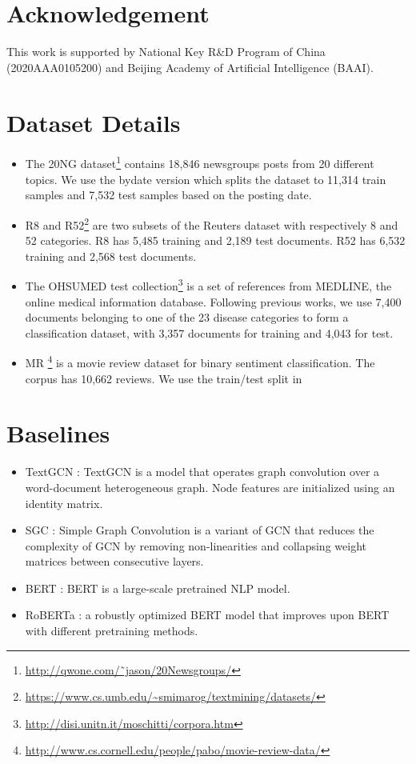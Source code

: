 \documentclass[11pt,a4paper]{article}
\begin{document}
\section*{Acknowledgement}
This work is supported by National Key R\&D Program of China (2020AAA0105200) and Beijing Academy of Artificial Intelligence (BAAI).




\appendix
\section{Dataset Details}
\begin{itemize}
    \item The 20NG dataset\footnote{\url{http://qwone.com/˜jason/20Newsgroups/}} contains 18,846 newsgroups posts from 20 different topics. We use the bydate version which splits the dataset to 11,314 train samples and 7,532 test samples based on the posting date.
    \item R8 and R52\footnote{\url{https://www.cs.umb.edu/~smimarog/textmining/datasets/}} are two subsets of the Reuters dataset with respectively 8 and 52 categories. R8 has 5,485 training and 2,189 test documents. R52 has 6,532 training and 2,568 test documents.
    \item The OHSUMED test collection\footnote{\url{http://disi.unitn.it/moschitti/corpora.htm}} is a set of references from MEDLINE, the online medical information database. Following previous works,  we use 7,400 documents belonging to one of the 23 disease categories to form a classification dataset, with 3,357 documents for training and 4,043 for test.
    \item MR \citep{pang-lee-2005-seeing}\footnote{\url{http://www.cs.cornell.edu/people/pabo/movie-review-data/}} is a movie review dataset for binary sentiment classification. The corpus has 10,662 reviews. We use the train/test split in \citet{tang2015pte}
\end{itemize}

\section{Baselines}
\begin{itemize}[noitemsep]
  \item TextGCN \citep{yao2019graph}: TextGCN is a model that operates graph convolution over a word-document heterogeneous graph. Node features are initialized using an identity matrix.
  \item SGC \citep{wu2019simplifying}: Simple Graph Convolution is a variant of GCN that reduces the complexity of GCN by removing non-linearities and collapsing weight matrices between consecutive layers.
  \item BERT \citep{devlin2018bert}: BERT is a large-scale pretrained NLP model.
  \item RoBERTa \citep{yinhan2019roberta}: a robustly optimized BERT model that improves upon BERT with different pretraining methods.
\end{itemize}
\end{document}
